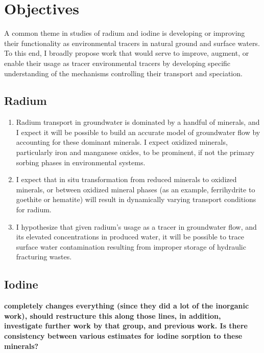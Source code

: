 \documentclass[twoside,12pt,titlepage]{article}
\begin{document}
\section{Objectives}

A common theme in studies of radium and iodine is developing or improving their functionality as environmental tracers in natural ground and surface waters. To this end, I broadly propose work that would serve to improve, augment, or enable their usage as tracer environmental tracers by developing specific understanding of the mechanisms controlling their transport and speciation.
\subsection{Radium}

\begin{enumerate}[label=\arabic*)]
	\item Radium transport in groundwater is dominated by a handful of minerals, and I expect it will be possible to build an accurate model of groundwater flow by accounting for these dominant minerals. I expect oxidized minerals, particularly iron and manganese oxides, to be prominent, if not the primary sorbing phases in environmental systems.
	\item I expect that in situ transformation from reduced minerals to oxidized minerals, or between oxidized mineral phases (as an example, ferrihydrite to goethite or hematite) will result in dynamically varying transport conditions for radium.
	\item I hypothesize that given radium's usage as a tracer in groundwater flow, and its elevated concentrations in produced water, it will be possible to trace surface water contamination resulting from improper storage of hydraulic fracturing wastes.
\end{enumerate}

\subsection{Iodine}

\textbf{\cite{Fuhrmann1998} completely changes everything (since they did a lot of the inorganic work), should restructure this along those lines, in addition, investigate further work by that group, and previous work. Is there consistency between various estimates for iodine sorption to these minerals?}
\end{document}

